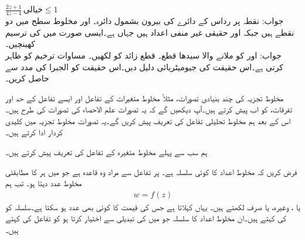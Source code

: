 \quad
$\tfrac{2z+1}{4z-4}\,\text{خیالی}\le 1$\\
جواب:\quad
نقطہ  پر رداس  کے دائرے کی بیرون بشمول دائرہ۔
\quad
{} اور  مخلوط سطح میں دو نقطے ہیں جبکہ  اور  حقیقی غیر منفی اعداد ہیں جہاں  ہے۔ایسی صورت میں  کی ترسیم کھینچیں۔\\
جواب:\quad
{} اور  کو ملانے والا سیدھا قطع۔
\quad
قطع زائد  کو  لکھیں۔
\quad
مساوات  ترخیم کو ظاہر کرتی ہے۔اس حقیقت کی جیومیٹریائی دلیل دیں۔اس حقیقت کو الجبرا کی مدد سے حاصل کریں۔ 

مخلوط تجزیہ کی چند بنیادی تصورات، مثلاً مخلوط متغیرات کے تفاعل اور ایسے تفاعل کے حد اور تفرقات، کو اب پیش کرتے ہیں۔آپ دیکھیں گے کہ یہ تصورات علم الاحصاء کی تصورات کی طرح ہیں۔اس کے بعد ہم مخلوط تحلیلی تفاعل کی تعریف پیش کریں گے۔یہ تصورات مخلوط تجزیہ میں کلیدی کردار ادا کرتے ہیں۔

ہم سب سے پہلے مخلوط متغیرہ کے تفاعل کی تعریف پیش کرتے ہیں۔

فرض کریں کہ  مخلوط اعداد کا کوئی سلسلہ ہے۔ پر  تفاعل سے مراد وہ قاعدہ ہے  جو  میں ہر  کا مطابقتی   مخلوط عدد  دیتا ہو۔ تب ہم
\begin{align*}
w=f(z)
\end{align*}
یا ، وغیرہ، یا صرف  لکھتے ہیں۔ یہاں   کہلاتا ہے جس کی قیمت  کا کوئی بھی عدد ہو سکتا ہے۔سلسلہ  کو  کی  کہتے ہیں۔ان مخلوط اعداد کا سلسلہ جو  میں  کی تبدیلی سے  اختیار کرتا ہو کو تفاعل  کی  کہتے ہیں۔

